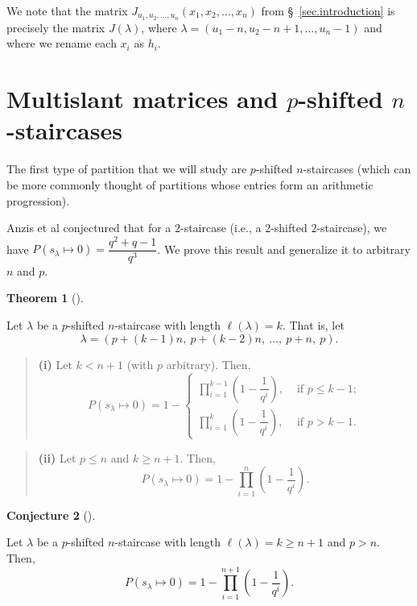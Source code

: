 \documentclass[numbers=enddot,12pt,final,onecolumn,notitlepage]{scrartcl}%
\theoremstyle{definition}
\newtheorem{theo}{Theorem}[section]
\newenvironment{theorem}[1][]
{\begin{theo}[#1]\begin{leftbar}}
{\end{leftbar}\end{theo}}
\newtheorem{defi}[theo]{Definition}
\newenvironment{definition}[1][]
{\begin{defi}[#1]\begin{leftbar}}
{\end{leftbar}\end{defi}}
\newtheorem{conj}[theo]{Conjecture}
\newenvironment{conjecture}[1][]
{\begin{conj}[#1]\begin{leftbar}}
{\end{leftbar}\end{conj}}
\newenvironment{statement}{\begin{quote}}{\end{quote}}
\let\prodnonlimits\prod
\renewcommand{\prod}{\prodnonlimits\limits}
\newcommand{\NN}{\mathbb{N}}
\newcommand{\tup}[1]{\left( #1 \right)}
\renewcommand{\leq}{\leqslant}
\renewcommand{\geq}{\geqslant}
\theoremstyle{plainsl}
\begin{document}

We note that the matrix $J_{u_1, u_2, \ldots, u_n}\tup{x_1, x_2, \ldots, x_n}$
from \S~\ref{sec.introduction} is precisely the matrix
$J\tup{\lambda}$, where
$\lambda = \tup{u_1 - n, u_2 - n+1, \ldots, u_n -1}$
and where we rename each $x_i$ as $h_i$.



\section{Multislant matrices and $p$-shifted $n$-staircases}

The first type of partition that we will study are $p$-shifted $n$-staircases (which can be more commonly thought of partitions whose entries form an arithmetic progression).


Anzis et al \cite{Anzis18} conjectured that for a $2$-staircase (i.e., a $2$-shifted $2$-staircase), we have $P(s_{\lambda} \longmapsto 0) = \dfrac{q^2+q -1}{q^3}$. We prove this result and generalize it to arbitrary $n$ and $p$.

\begin{theorem}
\label{thm.n.staircase}

Let $\lambda$ be a $p$-shifted $n$-staircase with
length $\ell(\lambda) = k$. That is, let
\[\lambda = (p+(k-1)n, \ p+(k-2)n, \ \ldots, \ p+n, \  p) . \]

\begin{statement}
\textbf{(i)} Let $k < n+1$ (with $p$ arbitrary). Then,
\[
P(s_{\lambda} \longmapsto 0) =
1 -
\begin{cases}
\prod_{i=1}^{k-1} \left(  1-\dfrac{1}{q^{i}}\right) ,
& \text{ if } p \leq k-1; \\
\prod_{i=1}^{k} \left(  1-\dfrac{1}{q^{i}}\right) ,
& \text{ if } p > k-1.
\end{cases}
\]
\end{statement}
 
\begin{statement}
\textbf{(ii)} Let $p \leq n$ and $k \geq n+1$. Then, 
\[
P(s_{\lambda} \longmapsto 0) = 1- \prod_{i=1}^{n} \left(  1-\dfrac{1}{q^{i}}\right) .
\]
\end{statement}
\end{theorem}
\begin{conjecture}
\label{bigoutwardstaircases}
Let $\lambda$ be a $p$-shifted $n$-staircase with length $\ell(\lambda) = k \geq n+1$ and $p > n$.  Then,
\[
P(s_{\lambda} \longmapsto 0) = 1-\prod_{i=1}^{n+1} \left(  1-\dfrac{1}{q^{i}}\right).
\]
\end{conjecture}
\end{document}
